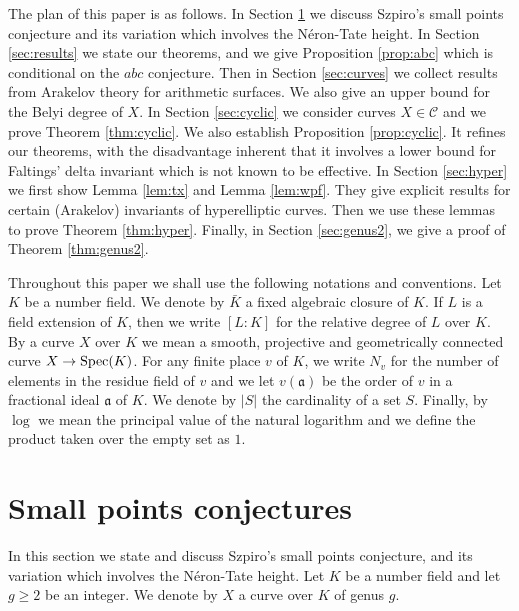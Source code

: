 \documentclass[11pt]{article}
\numberwithin{equation}{section}
\def\sp{\textnormal{Spec}}
\def\sp{\textnormal{Spec}}
\begin{document}
The plan of this paper is as follows. In Section \ref{sec:conj} we discuss Szpiro's small points conjecture and its variation which involves the N\'eron-Tate height. 
In Section \ref{sec:results} we state our theorems, and we give Proposition \ref{prop:abc} which is conditional on the $abc$ conjecture. 
Then in Section \ref{sec:curves} we collect results from Arakelov theory for arithmetic surfaces. We also give an upper bound for the Belyi degree of $X$. 
In Section \ref{sec:cyclic} we consider curves $X\in \mathcal C$ and we prove Theorem \ref{thm:cyclic}. We also establish Proposition \ref{prop:cyclic}. It refines our theorems, with the disadvantage inherent that it involves a lower bound for Faltings' delta invariant which is not known to be effective. 
In Section \ref{sec:hyper} we first show  Lemma \ref{lem:tx} and Lemma \ref{lem:wpf}. They give explicit results for certain (Arakelov) invariants of hyperelliptic curves. Then we use these lemmas to prove 
Theorem \ref{thm:hyper}. Finally, in Section \ref{sec:genus2}, we give a proof of Theorem \ref{thm:genus2}.

Throughout this paper we shall use the following notations and conventions. Let $K$ be a number field. We denote by $\bar{K}$ a fixed algebraic closure of $K$. If $L$ is a field extension of $K$, then we write $[L:K]$ for the relative degree of $L$ over $K$. By a curve $X$ over $K$ we mean a smooth, projective and geometrically connected curve $X\to\sp(K)$. 
For any finite place $v$ of $K$, we write $N_v$ for the number of elements in the residue field of $v$ and we let $v(\mathfrak a)$ be the order of $v$ in a fractional ideal $\mathfrak a$ of $K$. We denote by $\lvert S\rvert$ the cardinality of a set $S$. Finally, by $\log$ we mean the principal value of the natural logarithm and we define the product taken over the empty
set as $1$.

\section{Small points conjectures}\label{sec:conj}

In this section we state and discuss Szpiro's small points conjecture, and its variation which involves the N\'eron-Tate height. Let $K$ be a number field and let $g\geq 2$ be an integer. We denote by $X$ a curve over $K$ of genus $g$. 
\end{document}
